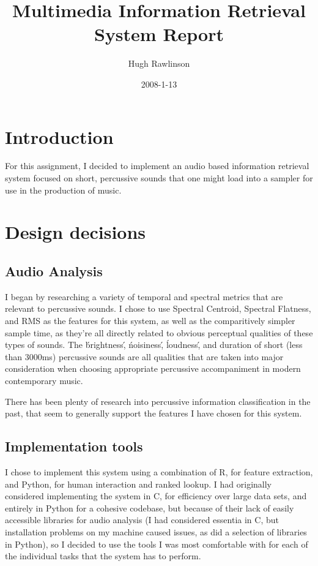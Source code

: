 \documentclass[a4paper,12pt]{article}
\begin{document}
\title{Multimedia Information Retrieval System Report}
\author{Hugh Rawlinson}
\date{2008-1-13}

\maketitle

\section{Introduction}

For this assignment, I decided to implement an audio based information retrieval system focused on short, percussive sounds that one might load into a sampler for use in the production of music. 

\section{Design decisions}
\subsection{Audio Analysis}
I began by researching a variety of temporal and spectral metrics that are relevant to percussive sounds.\cite{Peeters2004} I chose to use Spectral Centroid, Spectral Flatness, and RMS as the features for this system, as well as the comparitively simpler sample time, as they're all directly related to obvious perceptual qualities of these types of sounds. The \'brightness\', \'noisiness\', \'loudness\', and duration of short (less than 3000ms) percussive sounds are all qualities that are taken into major consideration when choosing appropriate percussive accompaniment in modern contemporary music.

There has been plenty of research into percussive information classification in the past\cite{kapur2004query}\cite{tindale2004retrieval}\cite{ono2008real}, that seem to generally support the features I have chosen for this system. 

\subsection{Implementation tools}
I chose to implement this system using a combination of R, for feature extraction, and Python, for human interaction and ranked lookup. I had originally considered implementing the system in C, for efficiency over large data sets, and entirely in Python for a cohesive codebase, but because of their lack of easily accessible libraries for audio analysis (I had considered essentia\cite{essentia} in C, but installation problems on my machine caused issues, as did a selection of libraries in Python), so I decided to use the tools I was most comfortable with for each of the individual tasks that the system has to perform.
\end{document}
